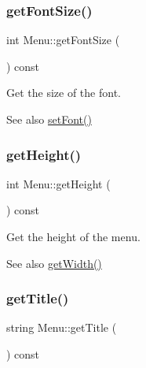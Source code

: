 \subsubsection{\texorpdfstring{get\+Font\+Size()}{getFontSize()}}
{\footnotesize\ttfamily int Menu\+::get\+Font\+Size (\begin{DoxyParamCaption}{ }\end{DoxyParamCaption}) const\hspace{0.3cm}{\ttfamily [inline]}}



Get the size of the font. 

\begin{DoxySeeAlso}{See also}
\mbox{\hyperlink{class_menu_ac8b1b161d1aa120db700d03c4b2c9617}{set\+Font()}} 
\end{DoxySeeAlso}
\mbox{\label{class_menu_a67f414acad54c237dc321a28b6ca723a}} 
\subsubsection{\texorpdfstring{get\+Height()}{getHeight()}}
{\footnotesize\ttfamily int Menu\+::get\+Height (\begin{DoxyParamCaption}{ }\end{DoxyParamCaption}) const\hspace{0.3cm}{\ttfamily [inline]}}



Get the height of the menu. 

\begin{DoxySeeAlso}{See also}
\mbox{\hyperlink{class_menu_a993d925b955146c9e265d16df1371f51}{get\+Width()}} 
\end{DoxySeeAlso}
\mbox{\label{class_menu_ab7f3050f8f8083debec68f6f83575379}} 
\subsubsection{\texorpdfstring{get\+Title()}{getTitle()}}
{\footnotesize\ttfamily string Menu\+::get\+Title (\begin{DoxyParamCaption}{ }\end{DoxyParamCaption}) const\hspace{0.3cm}{\ttfamily [inline]}}



